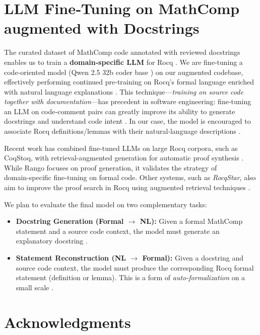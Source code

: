 \documentclass[11pt,a4paper]{article}
\begin{document}
\section*{LLM Fine‑Tuning on MathComp augmented with Docstrings}

The curated dataset of MathComp code annotated with reviewed docstrings enables us to train a \textbf{domain‑specific LLM} for Rocq \cite{florath2024coqlm,chakrabarty2024codedoc}. We are fine‑tuning a code‑oriented model (Qwen 2.5 32b coder base \cite{qwen25coder}) on our augmented codebase, effectively performing continued pre‑training on Rocq's formal language enriched with natural language explanations \cite{azerbayes2024llemma, wang2024theoremllama,song2025leancopilot}. This technique—\emph{training on source code together with documentation}—has precedent in software engineering: fine‑tuning an LLM on code‑comment pairs can greatly improve its ability to generate docstrings and understand code intent \cite{docstring_findings}. In our case, the model is encouraged to associate Rocq definitions/lemmas with their natural‑language descriptions \cite{azerbayes2024llemma, wang2024theoremllama}.

Recent work has combined fine-tuned LLMs on large Rocq corpora, such as CoqStoq, with retrieval-augmented generation for automatic proof synthesis \cite{thompson2025rango}. While Rango focuses on proof generation, it validates the strategy of domain‑specific fine‑tuning on formal code. Other systems, such as \emph{RocqStar}, also aim to improve the proof search in Rocq using augmented retrieval techniques \cite{kozyrev2025rocqstar}.

We plan to evaluate the final model on two complementary tasks: \begin{itemize}[leftmargin=1.5em] \item \textbf{Docstring Generation (Formal $\rightarrow$ NL):} Given a formal MathComp statement and a source code context, the model must generate an explanatory docstring \cite{chakrabarty2024codedoc}. \item \textbf{Statement Reconstruction (NL $\rightarrow$ Formal):} Given a docstring and source code context, the model must produce the corresponding Rocq formal statement (definition or lemma). This is a form of \emph{auto‑formalization} on a small scale \cite{lu2025autoformalization}. \end{itemize}

\section*{Acknowledgments}
\end{document}

